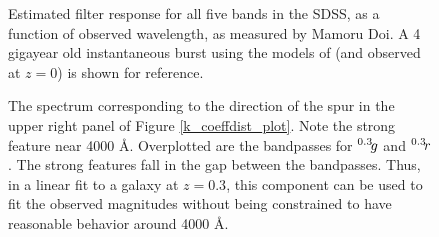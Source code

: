 \clearpage

\setcounter{thefigs}{0}

\clearpage
{}
\begin{figure}
\figurenum{\fignum}
\caption{\label{response_sdss} Estimated filter response for all five
bands in the SDSS, as a function of observed wavelength, as measured
by Mamoru Doi. A 4 gigayear old instantaneous burst using the models
of \citet{bruzual93a} (and observed at $z=0$) is shown for reference.}
\end{figure}

\clearpage
{}
\begin{figure}
\figurenum{\fignum}
\caption{\label{spur} The spectrum corresponding to the direction of
the spur in the upper right panel of Figure
\ref{k_coeffdist_plot}. Note the strong feature near 4000
\AA. Overplotted are the bandpasses for $^{{0.3}}\!{g}$ and
$^{{0.3}}\!{r}$. The strong features fall in the gap between the
bandpasses. Thus, in a linear fit to a galaxy at $z=0.3$, this
component can be used to fit the observed magnitudes without being
constrained to have reasonable behavior around 4000 \AA. }
\end{figure}



